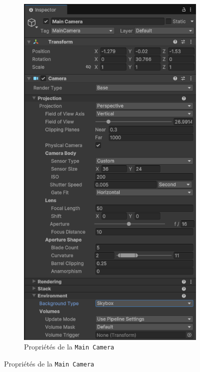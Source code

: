 \documentclass[a4paper,10pt]{article}
\begin{document}
\begin{figure}[h]
	\begin{subfigure}{\textwidth}
		\begin{center}
			\includegraphics[scale=.50]{fig/main_camera_inspector-01}
			\caption{Propriétés de la \texttt{Main Camera}}
			\label{fig:main_camera_inspector-01}
		\end{center}
	\end{subfigure}
\end{figure}
\end{document}
